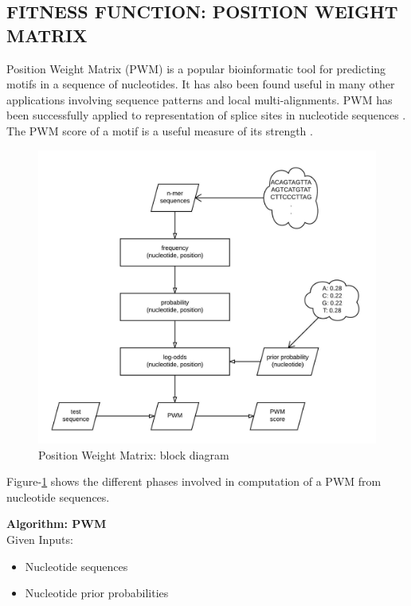 \documentclass[12pt,a4paper]{article}
\begin{document}
	\subsection{FITNESS FUNCTION: POSITION WEIGHT MATRIX} \label{sec-pwm}
	Position Weight Matrix (PWM) is a popular bioinformatic tool for predicting motifs in a sequence of nucleotides. It has also been found useful in many other applications involving sequence patterns and local multi-alignments. PWM has been successfully applied to representation of splice sites in nucleotide sequences \cite{pwm-2}. The PWM score of a motif is a useful measure of its strength \cite{pwm-1}. \par
	
	\begin{figure}[H]
		\label{fig:pwm}
		\includegraphics[width=\textwidth]{"pwm"}
		\caption{Position Weight Matrix: block diagram}
		\centering
	\end{figure}
	
	Figure-\ref{fig:pwm} shows the different phases involved in computation of a PWM from nucleotide sequences. \par
	\textbf{Algorithm: PWM} \\
	Given Inputs:
	\begin{itemize}
	\item Nucleotide sequences
	\item Nucleotide prior probabilities
	\end{itemize}
	
\end{document}
